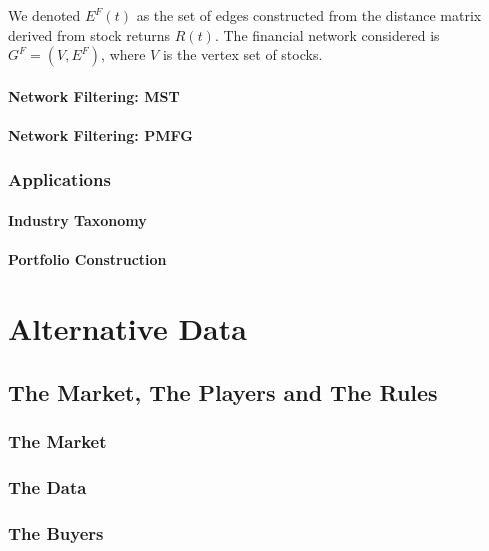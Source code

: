 \documentclass[]{book}
\theoremstyle{definition}
\theoremstyle{definition}
\theoremstyle{definition}
\theoremstyle{remark}
\begin{document}
We denoted \(E^{F}(t)\) as the set of edges constructed from the
distance matrix derived from stock returns \(R(t)\). The financial
network considered is \(G^{F} = ( V, E^{F} )\), where \(V\) is the
vertex set of stocks.

\subsection{Network Filtering: MST}\label{network-filtering-mst}

\subsection{Network Filtering: PMFG}\label{network-filtering-pmfg}

\section{Applications}\label{applications}

\subsection{Industry Taxonomy}\label{industry-taxonomy}

\subsection{Portfolio Construction}\label{portfolio-construction}

\part{Alternative Data}\label{part-alternative-data}

\chapter{The Market, The Players and The
Rules}\label{the-market-the-players-and-the-rules}

\section{The Market}\label{the-market}

\section{The Data}\label{the-data}

\section{The Buyers}\label{the-buyers}
\end{document}
